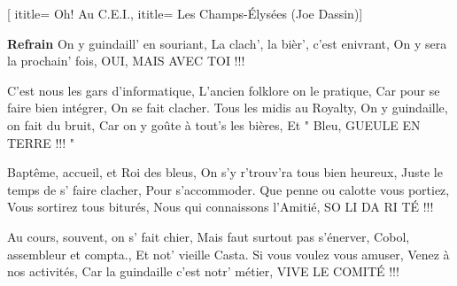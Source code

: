  [
ititle= {Oh! Au C.E.I.},
ititle= {Les Champs-Élysées (Joe Dassin)}]

\beginchorus
\textbf {Refrain}
On y guindaill' en souriant,
La clach', la bièr', c'est enivrant,
On y sera la prochain' fois,
OUI, MAIS AVEC TOI !!!
\endchorus

\beginverse
C'est nous les gars d'informatique,
L'ancien folklore on le pratique,
Car pour se faire bien intégrer,
On se fait clacher.
Tous les midis au Royalty,
On y guindaille, on fait du bruit,
Car on y goûte à tout's les bières,
Et " Bleu, GUEULE EN TERRE !!! "
\endverse

\beginverse
Baptême, accueil, et Roi des bleus,
On s'y r'trouv'ra tous bien heureux,
Juste le temps de s' faire clacher,
Pour s'accommoder.
Que penne ou calotte vous portiez,
Vous sortirez tous biturés,
Nous qui connaissons l'Amitié,
SO LI DA RI TÉ !!!
\endverse

\beginverse
Au cours, souvent, on s' fait chier,
Mais faut surtout pas s'énerver,
Cobol, assembleur et compta.,
Et not' vieille Casta.
Si vous voulez vous amuser,
Venez à nos activités,
Car la guindaille c'est notr' métier,
VIVE LE COMITÉ !!!
\endverse

\endsong
